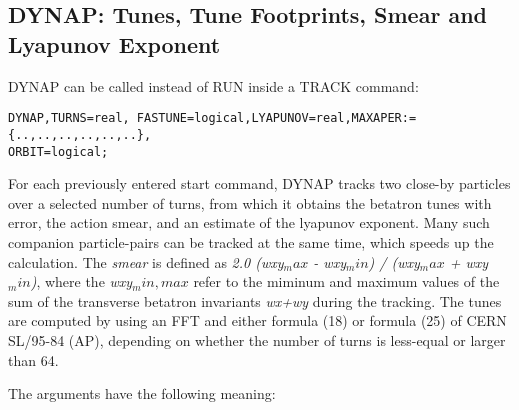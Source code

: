 




 

\subsection{DYNAP: Tunes, Tune Footprints, Smear and Lyapunov Exponent}


 DYNAP can be called instead of RUN inside a TRACK command:
 
\begin{verbatim}
DYNAP,TURNS=real, FASTUNE=logical,LYAPUNOV=real,MAXAPER:={..,..,..,..,..,..},
ORBIT=logical;
\end{verbatim}
 
 For each previously entered start command, 
 DYNAP tracks two close-by particles over a selected 
 number of turns, from which it obtains the
 betatron tunes with error, the action smear,
 and an estimate of  the lyapunov exponent. 
 Many such companion particle-pairs 
 can be tracked at the same time, which
 speeds up the calculation.
 The \textit{ smear } is defined as 
 \textit{2.0 (wxy$_max$ - wxy$_min$) / (wxy$_max$ + wxy
 $_min$)}, where the \textit{wxy$_min,max$} refer to the 
 miminum and maximum values of the sum of the transverse betatron invariants
 \textit{wx+wy} during the tracking. The tunes are computed by 
 using an FFT and either formula (18) or formula
 (25) of CERN SL/95-84 (AP),
 depending on whether the number of turns is less-equal or
 larger than 64.
 
 


 The arguments have the following meaning:
 
